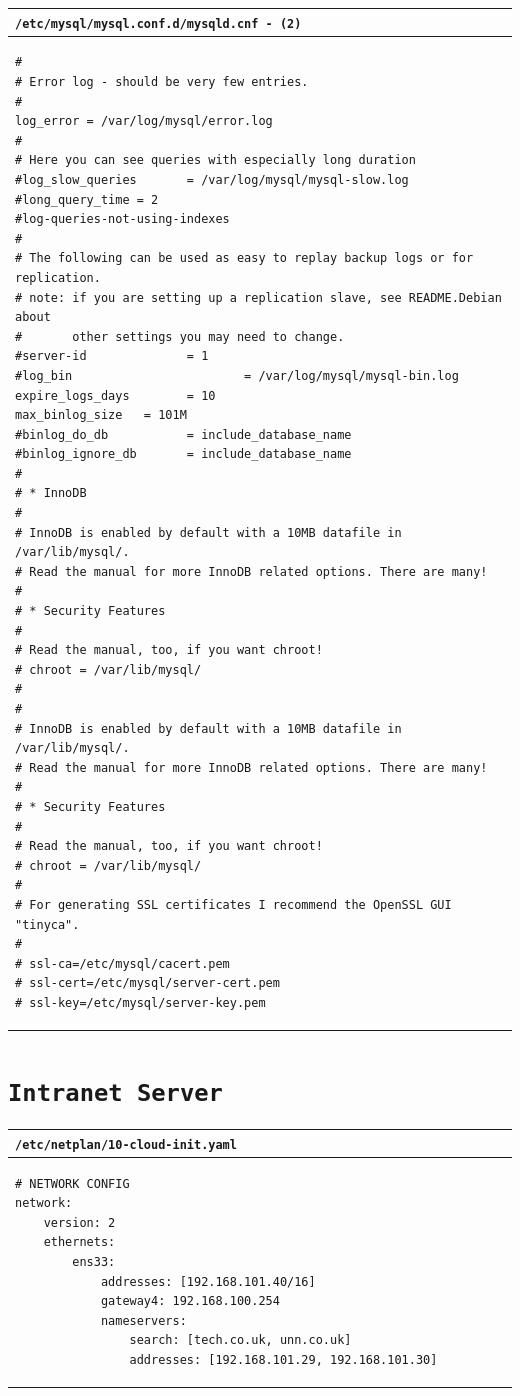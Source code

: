 \documentclass[11pt]{article}
\begin{document}
\begin{table}[ht]
    \begin{tabular}{|p{17.7cm}|} 
        \hline
        \texttt{\textbf{/etc/mysql/mysql.conf.d/mysqld.cnf} - \texttt{(2)}}\\ 
        \hline
        \lstset{
                basicstyle=\scriptsize\ttfamily,
              }
              \begin{lstlisting}
#
# Error log - should be very few entries.
#
log_error = /var/log/mysql/error.log
#
# Here you can see queries with especially long duration
#log_slow_queries       = /var/log/mysql/mysql-slow.log
#long_query_time = 2
#log-queries-not-using-indexes
#
# The following can be used as easy to replay backup logs or for replication.
# note: if you are setting up a replication slave, see README.Debian about
#       other settings you may need to change.
#server-id              = 1
#log_bin                        = /var/log/mysql/mysql-bin.log
expire_logs_days        = 10
max_binlog_size   = 101M
#binlog_do_db           = include_database_name
#binlog_ignore_db       = include_database_name
#
# * InnoDB
#
# InnoDB is enabled by default with a 10MB datafile in /var/lib/mysql/.
# Read the manual for more InnoDB related options. There are many!
#
# * Security Features
#
# Read the manual, too, if you want chroot!
# chroot = /var/lib/mysql/
#
#
# InnoDB is enabled by default with a 10MB datafile in /var/lib/mysql/.
# Read the manual for more InnoDB related options. There are many!
#
# * Security Features
#
# Read the manual, too, if you want chroot!
# chroot = /var/lib/mysql/
#
# For generating SSL certificates I recommend the OpenSSL GUI "tinyca".
#
# ssl-ca=/etc/mysql/cacert.pem
# ssl-cert=/etc/mysql/server-cert.pem
# ssl-key=/etc/mysql/server-key.pem                               
        \end{lstlisting}\\
        \hline
    \end{tabular}
\end{table}

\clearpage

\section{\texttt{Intranet Server}}
\begin{table}[ht]
    \begin{tabular}{|p{17.7cm}|} 
        \hline
        \texttt{\textbf{/etc/netplan/10-cloud-init.yaml}}\\ 
        \hline
        \lstset{
                basicstyle=\scriptsize\ttfamily,
              }
              \begin{lstlisting}
# NETWORK CONFIG
network:
    version: 2
    ethernets:
        ens33:
            addresses: [192.168.101.40/16]
            gateway4: 192.168.100.254
            nameservers:
                search: [tech.co.uk, unn.co.uk]
                addresses: [192.168.101.29, 192.168.101.30]                
        \end{lstlisting}\\
        \hline
    \end{tabular}
\end{table}
\end{document}
